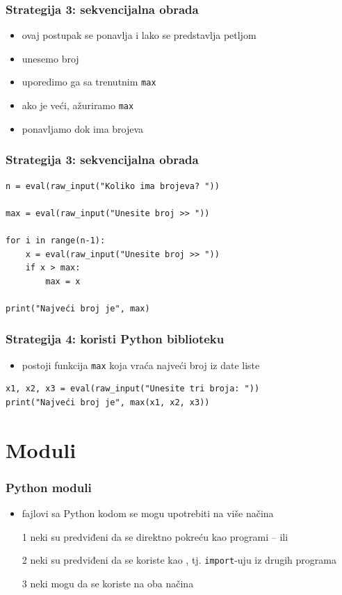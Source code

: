 \documentclass[utf8,compress]{beamer}
\begin{document}
\begin{frame}[fragile]
  \frametitle{Strategija 3: sekvencijalna obrada}
  \begin{itemize}
    \item ovaj postupak se ponavlja i lako se predstavlja petljom
    \item unesemo broj
    \item uporedimo ga sa trenutnim \texttt{max}
    \item ako je veći, ažuriramo \texttt{max}
    \item ponavljamo dok ima brojeva
  \end{itemize}
\end{frame}

\begin{frame}[fragile]
  \frametitle{Strategija 3: sekvencijalna obrada}
\begin{verbatim}
n = eval(raw_input("Koliko ima brojeva? "))

max = eval(raw_input("Unesite broj >> "))

for i in range(n-1): 
    x = eval(raw_input("Unesite broj >> "))
    if x > max:
        max = x

print("Najveći broj je", max)
\end{verbatim}
\end{frame}

\begin{frame}[fragile]
  \frametitle{Strategija 4: koristi Python biblioteku}
  \begin{itemize}
    \item postoji funkcija \texttt{max} koja vraća najveći broj iz date liste
  \end{itemize}
\begin{verbatim}
x1, x2, x3 = eval(raw_input("Unesite tri broja: "))
print("Najveći broj je", max(x1, x2, x3))
\end{verbatim}
\end{frame}

\section{Moduli}

\begin{frame}[fragile]
  \frametitle{Python moduli}
  \begin{itemize}
    \item fajlovi sa Python kodom se mogu upotrebiti na više načina
    \item[1] neki su predviđeni da se direktno pokreću kao programi --  ili 
    \item[2] neki su predviđeni da se koriste kao , tj. \texttt{import}-uju iz drugih programa
    \item[3] neki mogu da se koriste na oba načina
  \end{itemize}
\end{frame}
\end{document}

